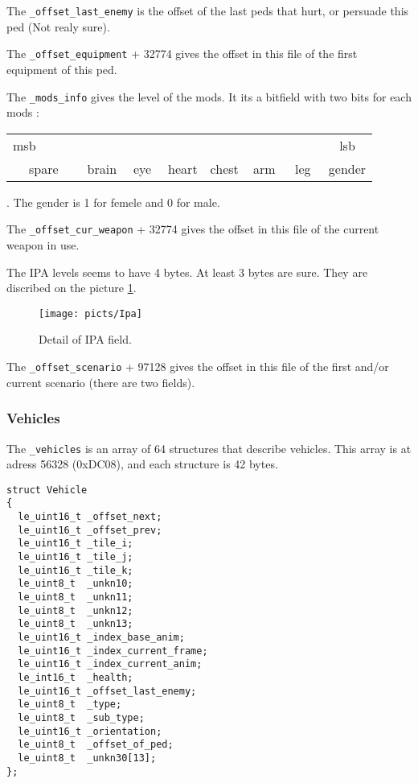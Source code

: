 \documentclass[a4paper,twoside,12pt,dvips]{article}
\begin{document}
The \texttt{\_offset\_last\_enemy} is the offset of the last peds that hurt, or persuade this ped (Not realy sure).

The \texttt{\_offset\_equipment} + 32774 gives the offset in this file of the first equipment of this ped.

The \texttt{\_mods\_info} gives the level of the mods. It its a bitfield with two bits for each mods :
\begin{tabular}{|*{16}{c|}}
   \hline
   msb & ~ & ~ & ~ & ~ & ~ & ~ & ~ & ~ & ~ & ~ & ~ & ~ & ~ & ~ & lsb\\
   \multicolumn{3}{|c|}{spare} & 
   \multicolumn{2}{|c|}{brain} &
   \multicolumn{2}{|c|}{eye} &
   \multicolumn{2}{|c|}{heart} &
   \multicolumn{2}{|c|}{chest} &
   \multicolumn{2}{|c|}{arm} &
   \multicolumn{2}{|c|}{leg} &
   gender\\
   \hline
\end{tabular}.
The gender is 1 for femele and 0 for male.

The \texttt{\_offset\_cur\_weapon} + 32774 gives the offset in this file of the current weapon in use.

The IPA levels seems to have 4 bytes. At least 3 bytes are sure. They are discribed on the picture \ref{fig:ipa}.
\begin{figure}[htbp]
  \texttt{[image: picts/Ipa]}\centering 
  \caption{Detail of IPA field.}
  \label{fig:ipa}
\end{figure}

The \texttt{\_offset\_scenario} + 97128 gives the offset in this file of the first and/or current scenario (there are two fields).


\subsubsection{Vehicles}
\label{sec:vehicles}

The \texttt{\_vehicles} is an array of 64 structures that describe vehicles. This array is at adress 56328 (0xDC08), and each structure is 42 bytes.

\begin{lstlisting}
struct Vehicle 
{
  le_uint16_t _offset_next;
  le_uint16_t _offset_prev;
  le_uint16_t _tile_i;
  le_uint16_t _tile_j;
  le_uint16_t _tile_k;
  le_uint8_t  _unkn10;
  le_uint8_t  _unkn11;
  le_uint8_t  _unkn12;
  le_uint8_t  _unkn13;
  le_uint16_t _index_base_anim;
  le_uint16_t _index_current_frame;
  le_uint16_t _index_current_anim;
  le_int16_t  _health;
  le_uint16_t _offset_last_enemy;
  le_uint8_t  _type;
  le_uint8_t  _sub_type;
  le_uint16_t _orientation;
  le_uint8_t  _offset_of_ped;
  le_uint8_t  _unkn30[13];
};
\end{lstlisting}
\end{document}
